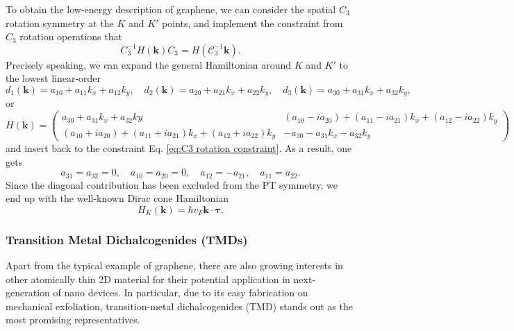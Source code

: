 To obtain the low-energy description of graphene, we can consider the spatial $C_3$ rotation symmetry at the $K$ and $K'$ points, and implement the constraint from $C_3$ rotation operations that
\begin{equation}\label{eq:C3 rotation constraint}
    C_3^{-1}H(\bm k)C_3=H(\mathcal C_3^{-1}\bm k).
\end{equation}
\noindent Precisely speaking, we can expand the general Hamiltonian around $K$ and $K'$ to the lowest linear-order
\begin{equation*}
    d_1(\bm k)=a_{10}+a_{11}k_x+a_{12}k_y,\quad d_2(\bm k)=a_{20}+a_{21}k_x+a_{22}k_y,\quad d_3(\bm k)=a_{30}+a_{31}k_x+a_{32}k_y,
\end{equation*}
or
\begin{equation*}
    H(\bm k)=\begin{pmatrix}
        a_{30}+a_{31}k_x+a_{32}ky                                & (a_{10}-ia_{20})+(a_{11}-ia_{21})k_x+(a_{12}-ia_{22})k_y \\
        (a_{10}+ia_{20})+(a_{11}+ia_{21})k_x+(a_{12}+ia_{22})k_y & -a_{30}-a_{31}k_x-a_{32}k_y
    \end{pmatrix}
\end{equation*}
and insert back to the constraint Eq. \eqref{eq:C3 rotation constraint}. As a result, one gets
\begin{equation*}
    a_{31}=a_{32}=0,\quad a_{10}=a_{20}=0,\quad a_{12}=-a_{21},\quad a_{11}=a_{22}.
\end{equation*}
Since the diagonal contribution has been excluded from the PT symmetry, we end up with the well-known Dirac cone Hamiltonian
\begin{equation}
    H_K(\bm k)=\hbar v_F\bm k\cdot\bm\tau.
\end{equation}

\subsubsection{Transition Metal Dichalcogenides (TMDs)}
Apart from the typical example of graphene, there are also growing interests in other atomically thin 2D material for their potential application in next-generation of nano devices. In particular, due to its easy fabrication on mechanical exfoliation, transition-metal dichalcogenides (TMD) stands out as the most promising representatives.



